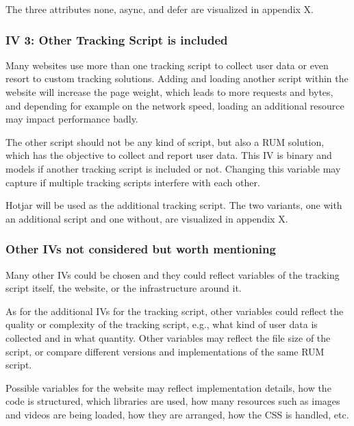 The three attributes none, async, and defer are visualized in appendix X.



\subsubsection{IV 3: Other Tracking Script is included}

Many websites use more than one tracking script to collect user data or even resort to custom tracking solutions.
Adding and loading another script within the website will increase the page weight, which leads to more requests and bytes, and depending for example on the network speed, loading an additional resource may impact performance badly.

The other script should not be any kind of script, but also a RUM solution, which has the objective to collect and report user data.
This IV is binary and models if another tracking script is included or not.
Changing this variable may capture if multiple tracking scripts interfere with each other.

Hotjar will be used as the additional tracking script.
The two variants, one with an additional script and one without, are visualized in appendix X.



\subsubsection{Other IVs not considered but worth mentioning}

Many other IVs could be chosen and they could reflect variables of the tracking script itself, the website, or the infrastructure around it.


As for the additional IVs for the tracking script, other variables could reflect the quality or complexity of the tracking script, e.g., what kind of user data is collected and in what quantity.
Other variables may reflect the file size of the script, or compare different versions and implementations of the same RUM script.


Possible variables for the website may reflect implementation details, how the code is structured, which libraries are used, how many resources such as images and videos are being loaded, how they are arranged, how the CSS is handled, etc.

